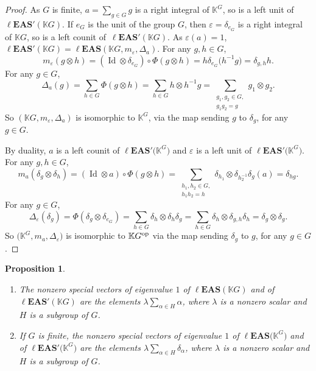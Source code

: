 \documentclass[pdftex]{sigma}
\numberwithin{equation}{section}
\newtheorem{Proposition}[Theorem]{Proposition}
 { \theoremstyle{definition}
\newtheorem{Definition}[Theorem]{Definition}
\newtheorem{Note}[Theorem]{Note}
\newtheorem{Example}[Theorem]{Example}
\newtheorem{Remark}[Theorem]{Remark}
\newtheorem{Notation}[Theorem]{Notation}}
\newcommand{\leas}{\ell\mathbf{EAS}}
\begin{document}
\begin{proof}
As $G$ is finite, $a= \sum_{g\in G} g$ is a right integral of $\mathbb{K}^G$, so is a left unit of $\leas'(\mathbb{K} G)$.
If $e_G$ is the unit of the group $G$, then $\varepsilon=\delta_{e_G}$ is a right integral of $\mathbb{K} G$, so is a left counit of~$\leas'(\mathbb{K} G)$. As $\varepsilon(a)=1$, $\leas'(\mathbb{K} G)=\leas(\mathbb{K} G,m_\varepsilon,\Delta_a)$. For any $g,h\in G$,
\[m_\varepsilon(g\otimes h)=(\operatorname{Id} \otimes \delta_{e_G})\circ \Phi(g\otimes h)=h \delta_{e_G}\bigl(h^{-1}g\bigr)=\delta_{g,h} h.\]
For any $g\in G$,
\[\Delta_a(g)=\sum_{h\in G}\Phi(g\otimes h)=\sum_{h\in G}h\otimes h^{-1}g=\sum_{\substack{g_1,g_2\in G,\\ g_1g_2=g}}g_1\otimes g_2.\]
So $(\mathbb{K} G,m_\varepsilon,\Delta_a)$ is isomorphic to $\mathbb{K}^G$, via the map sending $g$ to $\delta_g$, for any $g\in G$.

By duality, $a$ is a left counit of $\leas'\bigl(\mathbb{K}^G\bigr)$ and $\varepsilon$ is a left unit of $\leas'\bigl(\mathbb{K}^G\bigr)$. For any $g,h\in G$,
\[m_a(\delta_g \otimes \delta_h)=(\operatorname{Id} \otimes a)\circ \Phi(g\otimes h)=\sum_{\substack{h_1,h_2\in G,\\ h_1h_2=h}} \delta_{h_1}\otimes \delta_{h_2^{-1}}\delta_g(a)=\delta_{hg}. \]
For any $g\in G$,
\[\Delta_\varepsilon(\delta_g)=\Phi(\delta_g \otimes \delta_{e_G})=\sum_{h\in G}\delta_h \otimes \delta_h \delta_g=\sum_{h\in G}\delta_h \otimes \delta_{g,h} \delta_h=\delta_g \otimes \delta_g.\]
So $\bigl(\mathbb{K}^G,m_a,\Delta_\varepsilon\bigr)$ is isomorphic to $\mathbb{K} G^{\rm op}$ via the map sending $\delta_g$ to $g$, for any $g\in G$. \end{proof}

\begin{Proposition} \label{prop5.16}\quad
\begin{enumerate}\itemsep=0pt
\item[$(1)$] The nonzero special vectors of eigenvalue $1$ of $\leas(\mathbb{K} G)$ and of $\leas'(\mathbb{K} G)$ are the elements
$\lambda \sum_{\alpha \in H} \alpha$,
where $\lambda$ is a nonzero scalar and $H$ is a subgroup of $G$.
\item[$(2)$] If $G$ is finite, the nonzero special vectors of eigenvalue $1$ of $\leas\bigl(\mathbb{K}^G\bigr)$ and of $\leas'\bigl(\mathbb{K}^G\bigr)$ are the elements
$\lambda \sum_{\alpha \in H} \delta_\alpha$,
where $\lambda$ is a nonzero scalar and $H$ is a subgroup of $G$.
\end{enumerate} \end{Proposition}
\end{document}
